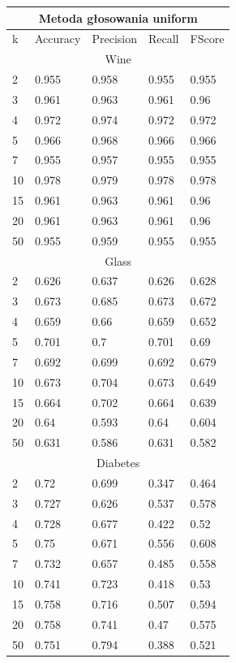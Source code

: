 \documentclass[12pt,a4paper]{article}
\begin{document}
 \begin{tabular}{ |p{2.5cm}||p{2.5cm}|p{2.5cm}|p{2.5cm}|p{2.5cm}| }
\hline
\multicolumn{5}{|c|}{Metoda głosowania uniform}\\
\hline
k & Accuracy & Precision & Recall & FScore \\
\hline
\multicolumn{5}{|c|}{Wine}\\
\hline
2 & 0.955 & 0.958 & 0.955 & 0.955\\
3 & 0.961 & 0.963 & 0.961 & 0.96\\
4 & 0.972 & 0.974 & 0.972 & 0.972\\
5 & 0.966 & 0.968 & 0.966 & 0.966\\
7 & 0.955 & 0.957 & 0.955 & 0.955\\
10 & 0.978 & 0.979 & 0.978 & 0.978\\
15 & 0.961 & 0.963 & 0.961 & 0.96\\
20 & 0.961 & 0.963 & 0.961 & 0.96\\
50 & 0.955 & 0.959 & 0.955 & 0.955\\
\hline
\multicolumn{5}{|c|}{Glass}\\
\hline
2 & 0.626 & 0.637 & 0.626 & 0.628\\
3 & 0.673 & 0.685 & 0.673 & 0.672\\
4 & 0.659 & 0.66 & 0.659 & 0.652\\
5 & 0.701 & 0.7 & 0.701 & 0.69\\
7 & 0.692 & 0.699 & 0.692 & 0.679\\
10 & 0.673 & 0.704 & 0.673 & 0.649\\
15 & 0.664 & 0.702 & 0.664 & 0.639\\
20 & 0.64 & 0.593 & 0.64 & 0.604\\
50 & 0.631 & 0.586 & 0.631 & 0.582\\
\hline
\multicolumn{5}{|c|}{Diabetes}\\
\hline
2 & 0.72 & 0.699 & 0.347 & 0.464\\
3 & 0.727 & 0.626 & 0.537 & 0.578\\
4 & 0.728 & 0.677 & 0.422 & 0.52\\
5 & 0.75 & 0.671 & 0.556 & 0.608\\
7 & 0.732 & 0.657 & 0.485 & 0.558\\
10 & 0.741 & 0.723 & 0.418 & 0.53\\
15 & 0.758 & 0.716 & 0.507 & 0.594\\
20 & 0.758 & 0.741 & 0.47 & 0.575\\
50 & 0.751 & 0.794 & 0.388 & 0.521\\

\end{tabular}
\end{document}
